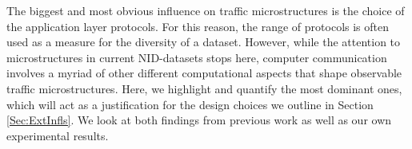 \documentclass[runningheads]{llncs}
\begin{document}
The biggest and most obvious influence on traffic microstructures is the choice of the application layer protocols. For this reason, the range of protocols is often used as a measure for the diversity of a dataset. However, while the attention to microstructures in current NID-datasets stops here, computer communication involves a myriad of other different computational aspects that shape observable traffic microstructures. Here, we highlight and quantify the most dominant ones, which will act as a justification for the design choices we outline in Section \ref{Sec:ExtInfls}. We look at both findings from previous work as well as our own experimental results.



 
\end{document}

